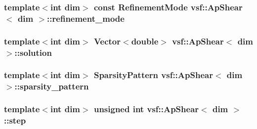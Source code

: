\hypertarget{classvsf_1_1ApShear_a523d3e34e242a9dbcf1d727dc17874b6}{
\subsubsection[{refinement\-\_\-mode}]{\setlength{\rightskip}{0pt plus 5cm}template$<$int dim$>$ const {\bf Refinement\-Mode} {\bf vsf\-::\-Ap\-Shear}$<$ dim $>$\-::refinement\-\_\-mode\hspace{0.3cm}{\ttfamily [private]}}}\label{classvsf_1_1ApShear_a523d3e34e242a9dbcf1d727dc17874b6}
\hypertarget{classvsf_1_1ApShear_ae4ee8cb26cbb92aa25fa91d2eb2198db}{
\subsubsection[{solution}]{\setlength{\rightskip}{0pt plus 5cm}template$<$int dim$>$ Vector$<$double$>$ {\bf vsf\-::\-Ap\-Shear}$<$ dim $>$\-::solution\hspace{0.3cm}{\ttfamily [private]}}}\label{classvsf_1_1ApShear_ae4ee8cb26cbb92aa25fa91d2eb2198db}
\hypertarget{classvsf_1_1ApShear_a065cb85ed84df073fd1b726667eebcc3}{
\subsubsection[{sparsity\-\_\-pattern}]{\setlength{\rightskip}{0pt plus 5cm}template$<$int dim$>$ Sparsity\-Pattern {\bf vsf\-::\-Ap\-Shear}$<$ dim $>$\-::sparsity\-\_\-pattern\hspace{0.3cm}{\ttfamily [private]}}}\label{classvsf_1_1ApShear_a065cb85ed84df073fd1b726667eebcc3}
\hypertarget{classvsf_1_1ApShear_aa8a20bee076f8edea5090fe587af2630}{
\subsubsection[{step}]{\setlength{\rightskip}{0pt plus 5cm}template$<$int dim$>$ unsigned int {\bf vsf\-::\-Ap\-Shear}$<$ dim $>$\-::step\hspace{0.3cm}{\ttfamily [private]}}}\label{classvsf_1_1ApShear_aa8a20bee076f8edea5090fe587af2630}
